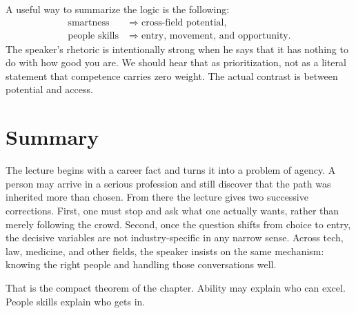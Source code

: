 A useful way to summarize the logic is the following:
\begin{align}
\text{smartness} &\Longrightarrow \text{cross-field potential},\\
\text{people skills} &\Longrightarrow \text{entry, movement, and opportunity}.
\end{align}
The speaker's rhetoric is intentionally strong when he says that it has nothing to do with how good you are. We should hear that as prioritization, not as a literal statement that competence carries zero weight. The actual contrast is between potential and access.

\section{Summary}

The lecture begins with a career fact and turns it into a problem of agency. A person may arrive in a serious profession and still discover that the path was inherited more than chosen. From there the lecture gives two successive corrections. First, one must stop and ask what one actually wants, rather than merely following the crowd. Second, once the question shifts from choice to entry, the decisive variables are not industry-specific in any narrow sense. Across tech, law, medicine, and other fields, the speaker insists on the same mechanism: knowing the right people and handling those conversations well.

That is the compact theorem of the chapter. Ability may explain who can excel. People skills explain who gets in.
